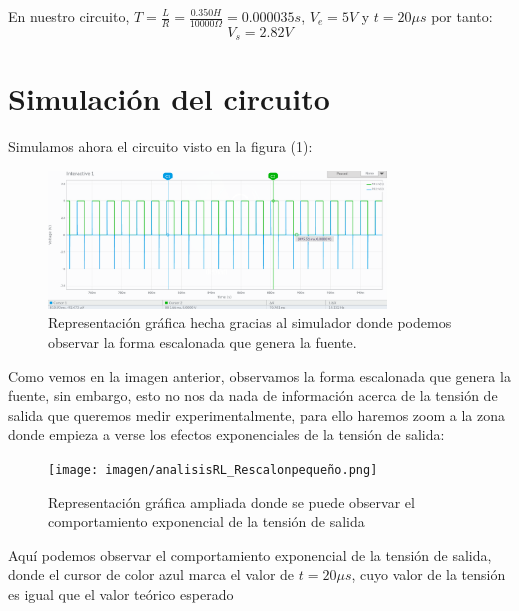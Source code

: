 \documentclass[11pt,letterpaper]{article}
\begin{document}
En nuestro circuito, $T=\frac{L}{R}=\frac{0.350 H}{10000 \Omega}= 0.000035 s$, $V_e= 5 V$ y $t=20\mu s$ por tanto:
\begin{equation}
	\boxed{V_s=2.82V}
\end{equation}
\section{Simulación del circuito}%
\label{sec:Simulación del circuito}
Simulamos ahora el circuito visto en la figura (1):
\begin{figure}[H]
	\centering
	\includegraphics[width=0.8\textwidth]{imagen/analisisRL_R_escalongrande.png}
	\caption{Representación gráfica hecha gracias al simulador donde podemos observar la forma escalonada que genera la fuente.}
	\label{fig:imagen-analisisRL_R_escalongrande-png}
\end{figure}
Como vemos en la imagen anterior, observamos la forma escalonada que genera la fuente, sin embargo, esto no nos da nada de información acerca de la tensión de salida que queremos medir experimentalmente, para ello haremos zoom a la zona donde empieza a verse los efectos exponenciales de la tensión de salida:
\begin{figure}[H]
	\centering
	\texttt{[image: imagen/analisisRL\_Rescalonpequeño.png]}
	\caption{Representación gráfica ampliada donde se puede observar el comportamiento exponencial de la tensión de salida}
	\label{fig:imagen-analisisRL_Rescalonpeque-png}
\end{figure}
Aquí podemos observar el comportamiento exponencial de la tensión de salida, donde el cursor de color azul marca el valor de $t=20\mu s$, cuyo valor de la tensión es igual que el valor teórico esperado
\end{document}
